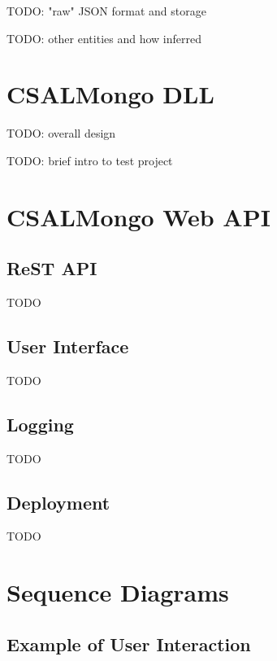 \documentclass[letterpaper,10pt]{article}
\begin{document}
TODO: "raw" JSON format and storage

TODO: other entities and how inferred


\section{CSALMongo DLL}

TODO: overall design

TODO: brief intro to test project


\section{CSALMongo Web API}
\label{sec:webapi}

\subsection{ReST API}

TODO

\subsection{User Interface}

TODO

\subsection{Logging}

TODO

\subsection{Deployment}
\label{subsec:deploy}
TODO


\section{Sequence Diagrams}

\subsection{Example of User Interaction}
\end{document}
